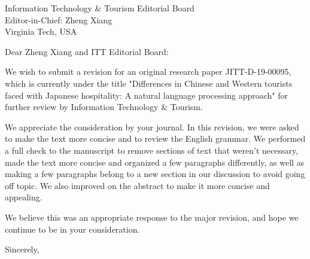 \documentclass{letter}
\begin{document}
\begin{letter}{
Information Technology \& Tourism Editorial Board \\
Editor-in-Chief:  Zheng Xiang\\
Virginia Tech, USA}

\opening{Dear Zheng Xiang and ITT Editorial Board:}

We wish to submit a revision for an original research paper JITT-D-19-00095, which is currently under the title "Differences in Chinese and Western tourists faced with Japanese hospitality: A natural language processing approach" for further review by Information Technology \& Tourism.

We appreciate the consideration by your journal. In this revision, we were asked to make the text more concise and to review the English grammar. We performed a full check to the manuscript to remove sections of text that weren't necessary, made the text more concise and organized a few paragraphs differently, as well as making a few paragraphs belong to a new section in our discussion to avoid going off topic. We also improved on the abstract to make it more concise and appealing.

We believe this was an appropriate response to the major revision, and hope we continue to be in your consideration.

\closing{Sincerely,}


\end{letter}
\end{document}

